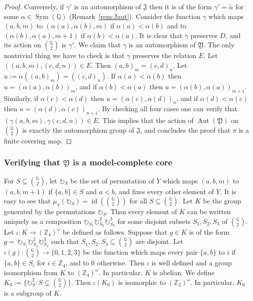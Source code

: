 \documentclass{amsart}
\theoremstyle{definition}
\theoremstyle{remark}
\numberwithin{equation}{section}
\newcommand{\mZ}{\mathbb Z}
\newcommand{\aut}{\operatorname{Aut}}
\newcommand{\sym}{\operatorname{Sym}}
\newcommand{\id}{\operatorname{id}}
\newcommand{\upairs}{{{\mathbb Q}\choose 2}}
\newcommand{\john}{\mathfrak{J}}
\newcommand{\fy}{\mathfrak{Y}}
\newcommand{\rotate}{\circlearrowright}
\begin{document}
\begin{proof}
    Conversely, if $\gamma'$ is an automorphism of $\john$ then it is of the form $\gamma'=\tilde{\alpha}$ for some $\alpha\in \sym({\mathbb Q})$ (Remark~\ref{rem:Jaut}). Consider the function $\gamma$ which maps $(a,b,m)$ to $(\alpha(a),\alpha(b),m)$ if $\alpha(a)<\alpha(b)$ and to $(\alpha(b),\alpha(a),m+1)$ if $\alpha(b)<\alpha(a)$. It is clear that $\gamma$ preserves $D$, and its action on $\upairs$ is $\gamma'$. We claim that $\gamma$ is an automorphism of $\fy$. The only nontrivial thing we have to check is that $\gamma$ preserves the relation $E$. Let $((a,b,m),(c,d,n))\in E$. Then $(a,b)_m=(c,d)_n$. Let $u:=\alpha((a,b)_m)=((c,d)_n)$. If $\alpha(a)<\alpha(b)$ then $u=(\alpha(a),\alpha(b))_m$, and if $\alpha(b)<\alpha(a)$ then $u=(\alpha(b),\alpha(a))_{m+1}$. Similarly, if $\alpha(c)<\alpha(d)$ then $u=(\alpha(c),\alpha(d))_n$, and if $\alpha(d)<\alpha(c)$ then $u=(\alpha(d),\alpha(c))_{n+1}$. By checking all four cases one can verify that $(\gamma(a,b,m),\gamma(c,d,n))\in E$. This implies that the action of $\aut(\fy)$ on $\upairs$ is exactly the automorphism group of $\john$, and concludes the proof that $\pi$ is a finite covering map.
\end{proof}

\subsubsection{Verifying that $\fy$ is a model-complete core}
    For $S\subseteq \upairs$, let  $\rotate_S$ be the set of permutation of $Y$ which maps $(a,b,m)$ to $(a,b,m+1)$ if $\{a,b\}\in S$ and $a<b$, and fixes every other element of $Y$. It is easy to see that $\mu_{\pi}(\rotate_S)=\id(\upairs)$ for all $S\subseteq \upairs$. Let $K$ be the group generated by the permutations $\rotate_S$. Then every element of $K$ can be written uniquely as a composition $\rotate_{S_1}\rotate_{S_2}^2\rotate_{S_3}^3$ for some disjoint subsets $S_1,S_2,S_3$ of $\upairs$. Let $\iota \colon K \to ({\mathbb Z}_4)^{\omega}$ be defined as follows. Suppose that $g\in K$ is of the form $g=\,\rotate_{S_1}\rotate_{S_2}^2\rotate_{S_3}^3$
    such that $S_1,S_2,S_3 \subseteq \upairs$ are disjoint. 
    Let $\iota(g) \colon {{\mathbb Q}\choose 2} \to \{0,1,2,3\}$ be the function which maps every pair $\{a,b\}$ to $i$ if $\{a,b\}\in S_i$ for $i \in \mZ_4$, and to $0$ otherwise. Then $\iota$ is well defined and a group isomorphism from $K$ to $({\mathbb Z}_4)^{\omega}$. In particular, $K$ is abelian. We define $K_0:=\{\rotate_S^2:S\subseteq \upairs\}$. Then $\iota(K_0)$ is isomorphic to $({\mathbb Z}_2)^{\omega}$. In particular, $K_0$ is a subgroup of $K$.
\end{document}
